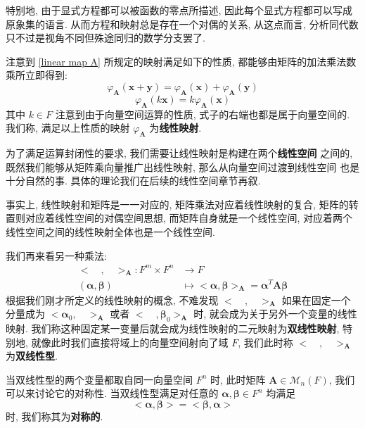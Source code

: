 \documentclass[UTF8]{book}
\begin{document}
特别地, 由于显式方程都可以被函数的零点所描述, 因此每个显式方程都可以写成
原象集的语言. 从而方程和映射总是存在一个对偶的关系, 从这点而言, 
分析同代数只不过是视角不同但殊途同归的数学分支罢了. 

注意到 \eqref{linear map A} 所规定的映射满足如下的性质, 
都能够由矩阵的加法乘法数乘所立即得到: 
$$ \varphi_{\boldsymbol{A}} (\boldsymbol{x}+\boldsymbol{y})
=\varphi_{\boldsymbol{A}}(\boldsymbol{x})
 + \varphi_{\boldsymbol{A}}(\boldsymbol{y}) $$
$$ \varphi_{\boldsymbol{A}}(k\boldsymbol{x})
= k\varphi_{\boldsymbol{A}}(\boldsymbol{x})$$
其中 $k\in F$ 
注意到由于向量空间运算的性质, 式子的右端也都是属于向量空间的. 
我们称, 满足以上性质的映射 $\varphi_{\boldsymbol{A}}$ 为\textbf{线性映射}. 

为了满足运算封闭性的要求, 我们需要让线性映射是构建在两个\textbf{线性空间}
之间的, 既然我们能够从矩阵乘向量推广出线性映射, 那么从向量空间过渡到线性空间
也是十分自然的事. 具体的理论我们在后续的线性空间章节再叙. 

事实上, 线性映射和矩阵是一一对应的, 矩阵乘法对应着线性映射的复合, 
矩阵的转置则对应着线性空间的对偶空间思想, 而矩阵自身就是一个线性空间, 
对应着两个线性空间之间的线性映射全体也是一个线性空间. 

我们再来看另一种乘法: 
\begin{equation} \label{bilinear maps A}
    \begin{aligned}
        <\quad,\quad>_{\boldsymbol{A}} : 
        F^m \times F^n &\to F \\
        (\boldsymbol{\alpha},\boldsymbol{\beta}) &\mapsto 
        <\boldsymbol{\alpha},\boldsymbol{\beta}>_{\boldsymbol{A}} =
        \boldsymbol{\alpha}^T \boldsymbol{A} \boldsymbol{\beta} 
    \end{aligned}
\end{equation}
根据我们刚才所定义的线性映射的概念, 不难发现 $ <\quad,\quad>_{\boldsymbol{A}} $ 
如果在固定一个分量成为 $<\boldsymbol{\alpha}_0,\quad>_{\boldsymbol{A}}$ 
或者 $<\quad,\boldsymbol{\beta}_0>_{\boldsymbol{A}}$ 时, 
就会成为关于另外一个变量的线性映射. 
我们称这种固定某一变量后就会成为线性映射的二元映射为\textbf{双线性映射}, 
特别地, 就像此时我们直接将域上的向量空间射向了域 $F$, 
我们此时称 $<\quad,\quad>_{\boldsymbol{A}}$ 为\textbf{双线性型}. 

当双线性型的两个变量都取自同一向量空间 $F^n$ 时, 此时矩阵 
$\boldsymbol{A}\in \mathcal{M}_n(F)$, 我们可以来讨论它的对称性. 
当双线性型满足对任意的 $\boldsymbol{\alpha},\boldsymbol{\beta} \in F^n$ 
均满足
$$  <\boldsymbol{\alpha},\boldsymbol{\beta}> =  
<\boldsymbol{\beta},\boldsymbol{\alpha}> $$
时, 我们称其为\textbf{对称的}.
\end{document}
